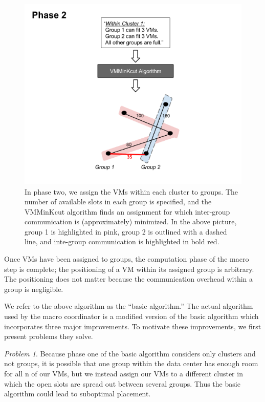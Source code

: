 \documentclass[11pt]{article}
\begin{document}
\begin{figure}
  \centering
\includegraphics[scale=0.7]{phase2.png}

 \caption{In phase two, we assign the VMs within each cluster to groups.  The number of available slots in each group is specified, and the VMMinKcut algorithm finds an assignment for which inter-group communication is (approximately) minimized.  In the above picture, group 1 is highlighted in pink, group 2 is outlined with a dashed line, and inte-group communication is highlighted in bold red.}

\end{figure}

Once VMs have been assigned to groups, the computation phase of the macro step is complete; the positioning of a VM within its assigned group is arbitrary.  The positioning does not matter because the communication overhead within a group is negligible.

We refer to the above algorithm as the “basic algorithm.”  The actual algorithm used by the macro coordinator is a modified version of the basic algorithm which incorporates three major improvements.  To motivate these improvements, we first present problems they solve.

\textit{Problem 1}. Because phase one of the basic algorithm considers only clusters and not groups, it is possible that one group within the data center has enough room for all n of our VMs, but we instead assign our VMs to a different cluster in which the open slots are spread out between several groups.  Thus the basic algorithm could lead to suboptimal placement.
\end{document}

